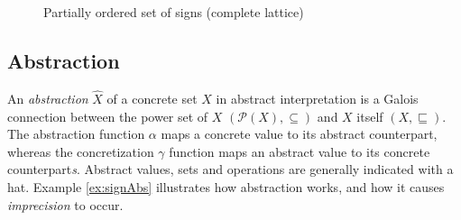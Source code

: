 
\begin{figure}
\centering
\caption{Partially ordered set of signs (complete lattice)}
\label{fig:lattice}
\end{figure}

\subsection{Abstraction}
An \textit{abstraction} $\hat{X}$ of a concrete set $X$ in abstract interpretation is a Galois connection between the power set of $X$ $(\mathcal{P}(X),\subseteq)$ and $X$ itself $(X,\sqsubseteq)$. The abstraction function $\alpha$ maps a concrete value to its abstract counterpart, whereas the concretization $\gamma$ function maps an abstract value to its concrete counterpart\textit{s}. Abstract values, sets and operations are generally indicated with a hat. Example \ref{ex:signAbs} illustrates how abstraction works, and how it causes \textit{imprecision} to occur.

